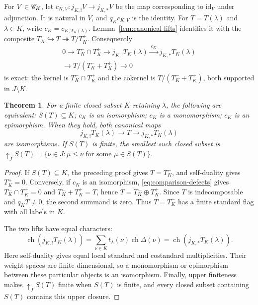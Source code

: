 \documentclass[11pt,reqno]{amsart}
\newtheorem{theorem}{Theorem}[section]
\theoremstyle{definition}
\theoremstyle{remark}
\numberwithin{equation}{section}
\begin{document}
For $V\in\mathscr C_K$, let
$c_{K,V}:j_{K,!}V\to j_{K,*}V$ be the map corresponding to
$\mathrm{id}_V$ under adjunction. It is natural in $V$, and $q_Kc_{K,V}$
is the identity. For $T=T(\lambda)$ and $\lambda\in K$, write
$c_K=c_{K,T_K(\lambda)}$. Lemma~\ref{lem:canonical-lifts} identifies
it with the composite $T_K^-\hookrightarrow T\twoheadrightarrow
T/T_K^+$. Consequently
\begin{equation}\label{eq:comparison-defects}
\begin{split}
 0\longrightarrow T_K^-\cap T_K^+
 \longrightarrow j_{K,!}T_K(\lambda)
 \xrightarrow{\ c_K\ }j_{K,*}T_K(\lambda)\\
 \longrightarrow T/(T_K^-+T_K^+)
 \longrightarrow0
\end{split}
\end{equation}
is exact: the kernel is $T_K^-\cap T_K^+$ and the cokernel is
$T/(T_K^-+T_K^+)$, both supported in $J\setminus K$.

\begin{theorem}\label{thm:adjoint-comparison}
For a finite closed subset $K$ retaining $\lambda$, the following are
equivalent: $S(T)\subseteq K$; $c_K$ is an isomorphism; $c_K$ is a
monomorphism; $c_K$ is an epimorphism. When they hold, both canonical
maps
\[
 j_{K,!}T_K(\lambda)\longrightarrow T
       \longrightarrow j_{K,*}T_K(\lambda)
\]
are isomorphisms. If $S(T)$ is finite, the smallest such closed subset is
$\uparrow_JS(T)=\{\nu\in J:\mu\leq\nu\text{ for some }\mu\in S(T)\}$.
\end{theorem}
\begin{proof}
If $S(T)\subseteq K$, the preceding proof gives $T=T_K^-$, and
self-duality gives $T_K^+=0$. Conversely, if $c_K$ is an isomorphism,
\eqref{eq:comparison-defects} gives
$T_K^-\cap T_K^+=0$ and $T_K^-+T_K^+=T$, hence
$T=T_K^-\oplus T_K^+$. Since $T$ is indecomposable and $q_KT\ne0$,
the second summand is zero. Thus $T=T_K^-$ has a finite standard flag
with all labels in $K$.

The two lifts have equal characters:
\[
 \operatorname{ch}(j_{K,!}T_K(\lambda))
  =\sum_{\nu\in K}t_\lambda(\nu)\operatorname{ch}\Delta(\nu)
  =\operatorname{ch}(j_{K,*}T_K(\lambda)).
\]
Here self-duality gives equal local standard and costandard
multiplicities. Their weight spaces are finite dimensional, so a
monomorphism or epimorphism between these particular objects is an
isomorphism. Finally, upper finiteness makes $\uparrow_JS(T)$ finite
when $S(T)$ is finite, and every closed subset containing $S(T)$ contains
this upper closure.
\end{proof}
\end{document}
